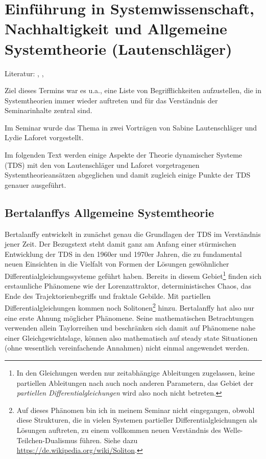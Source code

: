 \documentclass[11pt,a4paper]{article}
\begin{document}
\section{Einführung in Systemwissenschaft, Nachhaltigkeit und Allgemeine
Systemtheorie (Lautenschläger)}

Literatur: \cite{Bertalanffy1950}, \cite{Mele2010}, \cite{Binder2013}

Ziel dieses Termins war es u.a., eine Liste von Begriff\-lichkeiten
aufzustellen, die in Systemtheorien immer wieder auftreten und für das
Verständnis der Seminarinhalte zentral sind.

Im Seminar wurde das Thema in zwei Vorträgen von Sabine Lautenschläger und
Lydie Laforet vorgestellt.

Im folgenden Text werden einige Aspekte der Theorie dynamischer Systeme (TDS)
mit den von Lautenschläger und Laforet vorgetragenen Systemtheorieansätzen
abgeglichen und damit zugleich einige Punkte der TDS genauer ausgeführt.

\subsection{Bertalanffys Allgemeine Systemtheorie}

Bertalanffy entwickelt in \cite{Bertalanffy1950} zunächst genau die Grundlagen
der TDS im Verständnis jener Zeit.  Der Bezugstext steht damit ganz am Anfang
einer stürmischen Entwicklung der TDS in den 1960er und 1970er Jahren, die zu
fundamental neuen Einsichten in die Vielfalt von Formen der Lösungen
gewöhnlicher Differentialgleichungssysteme geführt haben.  Bereits in diesem
Gebiet\footnote{In den Gleichungen werden nur zeitabhängige Ableitungen
  zugelassen, keine partiellen Ableitungen nach auch noch anderen Parametern,
  das Gebiet der \emph{partiellen Differentialgleichungen} wird also noch
  nicht betreten.} finden sich erstaunliche Phänomene wie der Lorenzattraktor,
deterministisches Chaos, das Ende des Trajektorienbegriffs und fraktale
Gebilde. Mit partiellen Differentialgleichungen kommen noch
Solitonen\footnote{Auf dieses Phänomen bin ich in meinem Seminar nicht
  eingegangen, obwohl diese Strukturen, die in vielen Systemen partieller
  Differentialgleichungen als Lösungen auftreten, zu einem vollkommen neuen
  Verständnis des Welle-Teilchen-Dualismus führen. Siehe dazu
  \url{https://de.wikipedia.org/wiki/Soliton}. } hinzu. Bertalanffy hat also
nur eine erste Ahnung möglicher Phänomene. Seine mathematischen Betrachtungen
verwenden allein Taylorreihen und beschränken sich damit auf Phänomene nahe
einer Gleichgewichtslage, können also mathematisch auf steady state
Situationen (ohne wesentlich vereinfachende Annahmen) nicht einmal angewendet
werden.
\end{document}
